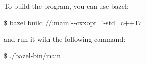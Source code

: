  To build the program, you can use bazel\+: 
\begin{DoxyPre}{\ttfamily \$ bazel build //:main -\/-\/cxxopt='-\/std=c++17'}\end{DoxyPre}
 and run it with the following command\+: 
\begin{DoxyPre}{\ttfamily \$ ./bazel-\/bin/main }\end{DoxyPre}
  